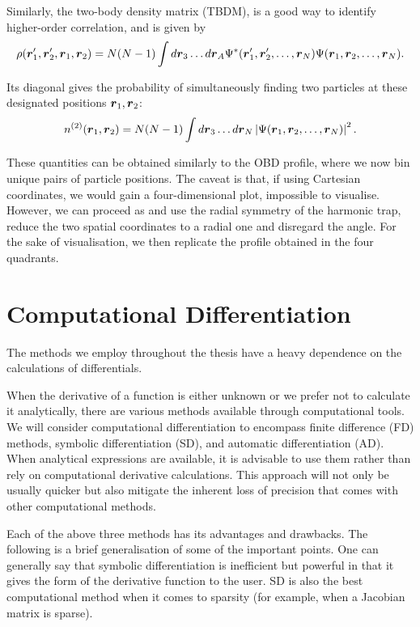 Similarly, the two-body density matrix (TBDM), is a good way to identify higher-order correlation, and is given by
\begin{align*}
    \rho(\boldsymbol{r}'_1,\boldsymbol{r}'_2,\boldsymbol{r}_1, \boldsymbol{r}_2) = N(N-1) \int d\boldsymbol{r}_3 \ldots d\boldsymbol{r}_A \Psi^*(\boldsymbol{r}'_1, \boldsymbol{r}'_2, \ldots, \boldsymbol{r}_N) \Psi(\boldsymbol{r}_1, \boldsymbol{r}_2, \ldots, \boldsymbol{r}_N).
\end{align*}

Its diagonal gives the probability of simultaneously finding two particles at these designated positions $\boldsymbol{r}_1,\boldsymbol{r}_2$:
\begin{align*}
    n^{(2)}(\boldsymbol{r}_1, \boldsymbol{r}_2) = N(N-1) \int d\boldsymbol{r}_3 \ldots d\boldsymbol{r}_N \left|\Psi(\boldsymbol{r}_1, \boldsymbol{r}_2, \ldots, \boldsymbol{r}_N)\right|^2.
\end{align*}

These quantities can be obtained similarly to the OBD profile, where we now bin unique pairs of particle positions. The caveat is that, if using Cartesian coordinates, we would gain a four-dimensional plot, impossible to visualise. However, we can proceed as \cite{Nordhagen2019} and use the radial symmetry of the harmonic trap, reduce the two spatial coordinates to a radial one and disregard the angle. For the sake of visualisation, we then replicate the profile obtained in the four quadrants.


\section{Computational Differentiation}\label{sec:cd}

The methods we employ throughout the thesis have a heavy dependence on the calculations of differentials.

When the derivative of a function is either unknown or we prefer not to calculate it analytically, there are various methods available through computational tools. We will consider computational differentiation to encompass finite difference (FD) methods, symbolic differentiation (SD), and automatic differentiation (AD). When analytical expressions are available, it is advisable to use them rather than rely on computational derivative calculations. This approach will not only be usually quicker but also mitigate the inherent loss of precision that comes with other computational methods.

Each of the above three methods has its advantages and drawbacks. The following is a brief generalisation of some of the important points. One can generally say that symbolic differentiation is inefficient but powerful in that it gives the form of the derivative function to the user. SD is also the best computational method when it comes to sparsity (for example, when a Jacobian matrix is sparse).


